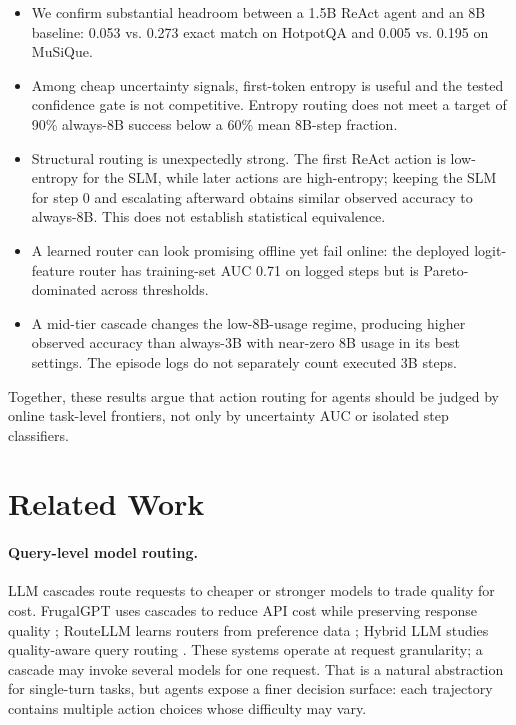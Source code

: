 \documentclass[sigplan,screen,review,anonymous,nonacm]{acmart}
\begin{document}
\begin{itemize}
  \item We confirm substantial headroom between a 1.5B ReAct agent and an 8B
  baseline: 0.053 vs. 0.273 exact match on HotpotQA and 0.005 vs. 0.195 on
  MuSiQue.
  \item Among cheap uncertainty signals, first-token entropy is useful and
  the tested confidence gate is not competitive. Entropy routing does not meet a
  target of 90\% always-8B success below a 60\% mean 8B-step fraction.
  \item Structural routing is unexpectedly strong. The first ReAct action is
  low-entropy for the SLM, while later actions are high-entropy; keeping the
  SLM for step 0 and escalating afterward obtains similar observed accuracy
  to always-8B. This does not establish statistical equivalence.
  \item A learned router can look promising offline yet fail online: the
  deployed logit-feature router has training-set AUC 0.71 on logged steps but is
  Pareto-dominated across thresholds.
  \item A mid-tier cascade changes the low-8B-usage regime, producing
  higher observed accuracy than always-3B with near-zero 8B usage in its
  best settings. The episode logs do not separately count executed 3B steps.
\end{itemize}

Together, these results argue that action routing for agents should be judged
by online task-level frontiers, not only by uncertainty AUC or isolated step
classifiers.

\section{Related Work}

\paragraph{Query-level model routing.}
LLM cascades route requests to cheaper or stronger models to trade quality for
cost. FrugalGPT uses cascades to reduce API cost while preserving response
quality \cite{frugalgpt}; RouteLLM learns routers from preference data
\cite{routellm}; Hybrid LLM studies quality-aware query routing
\cite{hybridllm}. These systems operate at request granularity; a cascade may invoke
several models for one request. That is a
natural abstraction for single-turn tasks, but agents expose a finer decision
surface: each trajectory contains multiple action choices whose difficulty may
vary.
\end{document}
